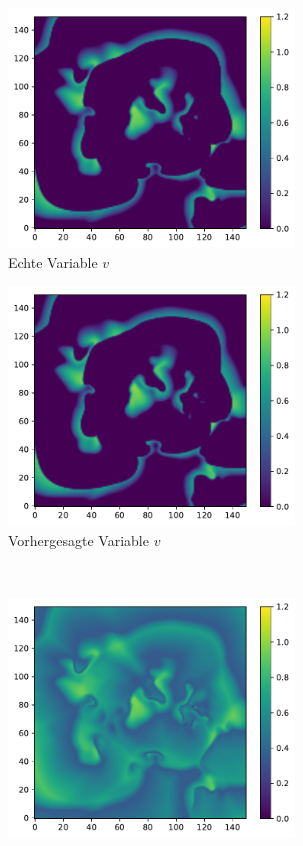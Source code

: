 \begin{figure}[H]
	\begin{subfigure}{0.5\textwidth}
		\centering
		\includegraphics[height=2.5in]{figures/results/cross_prediction/bocf_uv_orig.pdf}
		\caption{Echte Variable $v$}
	\end{subfigure}%
	\begin{subfigure}{0.5\textwidth}
		\centering
		\includegraphics[height=2.5in]{figures/results/cross_prediction/bocf_uv_pred.pdf}
		\caption{Vorhergesagte Variable $v$}
	\end{subfigure}%
	\\
	\begin{subfigure}{0.5\textwidth}
		\centering
		\includegraphics[height=2.5in]{figures/results/cross_prediction/bocf_uw_orig.pdf}

\end{subfigure}
\end{figure}
